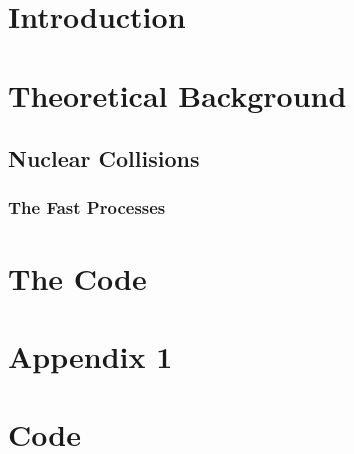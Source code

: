 
\tableofcontents
\clearpage

\pagestyle{scrheadings}
\ofoot[\pagemark]{\pagemark}
\cfoot[]{}

\setlength{\oddsidemargin}{8pt}
\setlength{\evensidemargin}{23pt}

%

\newpage
{}
\setcounter{page}{1}
\chapter{Introduction}
\label{sec:intro}


\chapter{Theoretical Background}
\label{sec:theory}
\section{Nuclear Collisions}
\subsection{The Fast Processes}
\label{sec:goldhaber}


\chapter{The Code}
\label{sec:code}

%



\printnomenclature
{}


\newpage
\appendix
{}
\chapter{Appendix 1}
\label{app:brho}

\chapter{Code}
\label{app:code}

